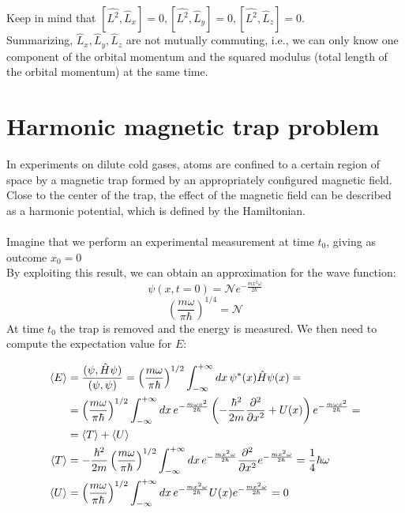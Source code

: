 	Keep in mind that $[\hat{L^2}, \hat{L}_{x}]=0,[\hat{L^2}, \hat{L}_{y}]=0,[\hat{L^2}, \hat{L}_{z}]=0$.\\
	\noindent
	Summarizing,  $\hat{L}_{x},\hat{L}_{y},\hat{L}_{z}$ are not mutually commuting, i.e., we can only know one component of the orbital momentum and the squared modulus (total length of the orbital momentum) at the same time.

\section{Harmonic magnetic trap problem}
In experiments on dilute cold gases, atoms are confined to a certain region of space by a magnetic trap formed by an appropriately configured magnetic field.
Close to the center of the trap, the effect of the magnetic field can be described as a harmonic potential, which is defined by the Hamiltonian.\\
\\
Imagine that we perform an experimental measurement at time $t_0$, giving as outcome $x_{0}=0$ \\
By exploiting this result, we can obtain an approximation for the wave function:
$$\psi(x,t=0)= \mathcal{N} e^{-\frac{m x^{2} \omega}{2 \hbar}}$$
$$
\left(\frac{m \omega}{ \pi \hbar}\right)^{1 / 4}=\mathcal{N}
$$
\noindent
At time $t_0$ the trap is removed and the energy is measured.
We then need to compute the expectation value for $E$:

\begin{align*}
	\expval{E} &=\frac{(\psi, \hat{H} \psi)}{(\psi, \psi)}=\left(\frac{m \omega}{ \pi \hbar}\right)^{1 / 2} \int_{-\infty}^{+\infty}d x\, \psi^{*}(x) \hat{H} \psi(x)=\\
					 	 &=\left(\frac{m \omega}{ \pi \hbar}\right)^{1 / 2} \int_{-\infty}^{+\infty} d x\,e^{-\frac{m \omega x^{2}}{2 \hbar}}\left(-\frac{\hbar^{2}}{2 m} \frac{\partial^{2}}{\partial x^{2}}+U(x)\right) e^{-\frac{m \omega x^{2}}{ 2\hbar}}=\\
						 &=\expval{T}+\expval{U}\\
	\expval{T} &=-\frac{\hbar^{2}}{2 m}\left(\frac{m \omega}{\pi \hbar}\right)^{1 / 2} \int_{-\infty}^{+\infty} d x\, e^{-\frac{m x^{2} \omega}{2 \hbar}} \frac{\partial^{2}}{\partial x^{2}} e^{-\frac{m x^{2} \omega}{2 \hbar}}=\frac{1}{4} \hbar \omega\\
	\expval{U} &=\left(\frac{m \omega}{\pi \hbar}\right)^{1 / 2} \int_{-\infty}^{+\infty} d x\, e^{-\frac{m x^{2} \omega}{2 \hbar}} U(x) e^{-\frac{m x^{2} \omega}{2 \hbar}}=0
\end{align*}

